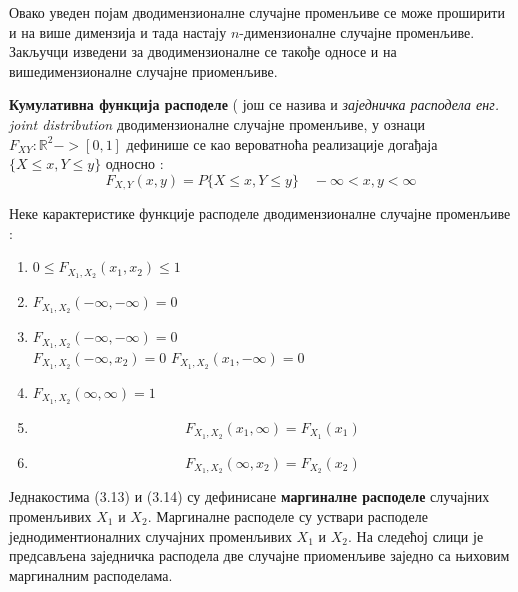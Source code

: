 Овако уведен појам дводимензионалне случајне променљиве се може проширити и на више димензија и тада настају $n$-димензионалне случајне променљиве. Закључци изведени за дводимензионалне се такође односе и на вишедимензионалне случајне приоменљиве.

\textbf{Кумулативна функција расподеле} ( још се назива и \textit{заједничка расподела енг. joint distribution} дводимензионалне случајне променљиве, у ознаци $ F_{XY} : \mathbb{R}^2 -> [0,1] $ дефинише се као вероватноћа реализације догађаја $ \lbrace X \leq x , Y \leq y \rbrace $ односно :
$$
F_{X,Y}(x,y) = P \lbrace X \leq x, Y \leq y \rbrace \quad  - \infty < x,y < \infty
$$

Неке карактеристике функције расподеле дводимензионалне случајне променљиве :

\begin{enumerate}

\item  $ 0 \leq F_{X_1,X_2}(x_1,x_2) \leq 1 $
\item  $ F_{X_1,X_2}(-\infty,-\infty) =0 $
\item  $ F_{X_1,X_2}(-\infty,-\infty) =0 $  \\
$ F_{X_1,X_2}(-\infty,x_2) =0 $
$ F_{X_1,X_2}(x_1,-\infty) =0 $
\item  $ F_{X_1,X_2}(\infty,\infty) =1 $
\item  \begin{equation}
F_{X_1,X_2}(x_1,\infty) = F_{X_1}(x_1) 
\end{equation} 
\item 
\begin{equation}
F_{X_1,X_2}(\infty,x_2) = F_{X_2}(x_2) 
\end{equation} 

\end{enumerate}


Једнакостима (3.13) и (3.14) су дефинисане \textbf{маргиналне расподеле} случајних променљивих $X_1$ и $X_2$. Маргиналне расподеле су уствари расподеле једнодиментионалних случајних променљивих $X_1$ и $X_2$. На следећој слици је предсављена заједничка расподела две случајне приоменљиве заједно са њиховим маргиналним расподелама.

